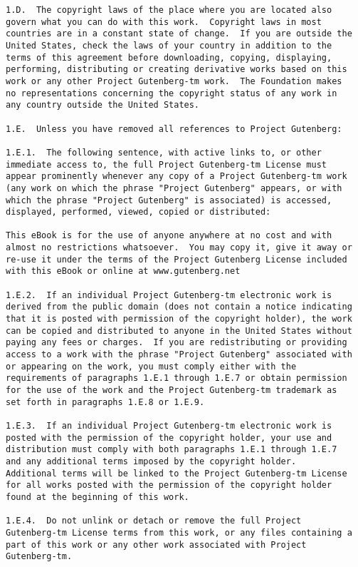\documentclass[oneside,12pt]{book}
\begin{document}
\begin{verbatim}
1.D.  The copyright laws of the place where you are located also
govern what you can do with this work.  Copyright laws in most
countries are in a constant state of change.  If you are outside the
United States, check the laws of your country in addition to the
terms of this agreement before downloading, copying, displaying,
performing, distributing or creating derivative works based on this
work or any other Project Gutenberg-tm work.  The Foundation makes
no representations concerning the copyright status of any work in
any country outside the United States.

1.E.  Unless you have removed all references to Project Gutenberg:

1.E.1.  The following sentence, with active links to, or other
immediate access to, the full Project Gutenberg-tm License must
appear prominently whenever any copy of a Project Gutenberg-tm work
(any work on which the phrase "Project Gutenberg" appears, or with
which the phrase "Project Gutenberg" is associated) is accessed,
displayed, performed, viewed, copied or distributed:

This eBook is for the use of anyone anywhere at no cost and with
almost no restrictions whatsoever.  You may copy it, give it away or
re-use it under the terms of the Project Gutenberg License included
with this eBook or online at www.gutenberg.net

1.E.2.  If an individual Project Gutenberg-tm electronic work is
derived from the public domain (does not contain a notice indicating
that it is posted with permission of the copyright holder), the work
can be copied and distributed to anyone in the United States without
paying any fees or charges.  If you are redistributing or providing
access to a work with the phrase "Project Gutenberg" associated with
or appearing on the work, you must comply either with the
requirements of paragraphs 1.E.1 through 1.E.7 or obtain permission
for the use of the work and the Project Gutenberg-tm trademark as
set forth in paragraphs 1.E.8 or 1.E.9.

1.E.3.  If an individual Project Gutenberg-tm electronic work is
posted with the permission of the copyright holder, your use and
distribution must comply with both paragraphs 1.E.1 through 1.E.7
and any additional terms imposed by the copyright holder.
Additional terms will be linked to the Project Gutenberg-tm License
for all works posted with the permission of the copyright holder
found at the beginning of this work.

1.E.4.  Do not unlink or detach or remove the full Project
Gutenberg-tm License terms from this work, or any files containing a
part of this work or any other work associated with Project
Gutenberg-tm.


\end{verbatim}
\end{document}
